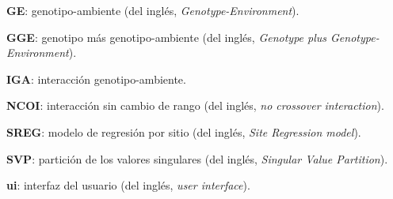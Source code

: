 \begin{spacing}{1}
\begin{description}
\item{\textbf{GE}}: genotipo-ambiente (del inglés, \emph{Genotype-Environment}).

\item{\textbf{GGE}}: genotipo más genotipo-ambiente (del inglés, \emph{Genotype plus Genotype-Environment}).

\item{\textbf{IGA}}: interacción genotipo-ambiente.

\item{\textbf{NCOI}}: interacción sin cambio de rango (del inglés, \emph{no crossover interaction}).

\item{\textbf{SREG}}: modelo de regresión por sitio (del inglés, \emph{Site Regression model}).

\item{\textbf{SVP}}: partición de los valores singulares (del inglés, \emph{Singular Value Partition}).

\item{\textbf{ui}}: interfaz del usuario (del inglés, \emph{user interface}).


\end{description}
\end{spacing}